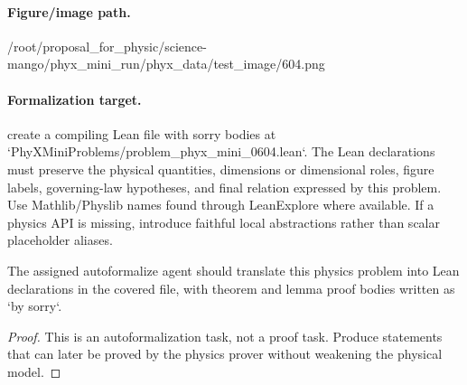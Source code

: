 \paragraph{Figure/image path.}
/root/proposal\_for\_physic/science-mango/phyx\_mini\_run/phyx\_data/test\_image/604.png

\paragraph{Formalization target.}
create a compiling Lean file with sorry bodies at `PhyXMiniProblems/problem\_phyx\_mini\_0604.lean`. The Lean declarations must preserve the physical quantities, dimensions or dimensional roles, figure labels, governing-law hypotheses, and final relation expressed by this problem.
Use Mathlib/Physlib names found through LeanExplore where available. If a physics API is missing, introduce faithful local abstractions rather than scalar placeholder aliases.

\begin{theorem}
\label{thm:physics:phyx_mini_0604:target}
The assigned autoformalize agent should translate this physics problem into Lean declarations in the covered file, with theorem and lemma proof bodies written as `by sorry`.
\end{theorem}
\begin{proof}
This is an autoformalization task, not a proof task. Produce statements that can later be proved by the physics prover without weakening the physical model.
\end{proof}

